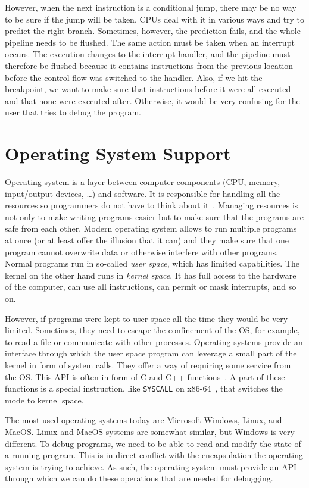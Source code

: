 However, when the next instruction is a conditional jump, there may be no way
to be sure if the jump will be taken. CPUs deal with it in various ways and try
to predict the right branch. Sometimes, however, the prediction fails, and the
whole pipeline needs to be flushed. The same action must be taken when an
interrupt occurs. The execution changes to the interrupt handler, and the
pipeline must therefore be flushed because it contains instructions from the
previous location before the control flow was switched to the handler. Also, if
we hit the breakpoint, we want to make sure that instructions before it were
all executed and that none were executed after. Otherwise, it would be very
confusing for the user that tries to debug the program.

\section{Operating System Support}
Operating system is a layer between computer components (CPU, memory,
input/output devices, \dots) and software. It is responsible for handling all
the resources so programmers do not have to think about it~\cite{modern-os,
os-concepts}. Managing resources is not only to make writing programs easier
but to make sure that the programs are safe from each other. Modern operating
system allows to run multiple programs at once (or at least offer the illusion
that it can) and they make sure that one program cannot overwrite data or
otherwise interfere with other programs. Normal programs run in so-called
\textit{user space}, which has limited capabilities. The kernel on the other
hand runs in \textit{kernel space}. It has full access to the hardware of the
computer, can use all instructions, can permit or mask interrupts, and so on.

However, if programs were kept to user space all the time they would be very
limited. Sometimes, they need to escape the confinement of the OS, for example,
to read a file or communicate with other processes. Operating systems provide
an interface through which the user space program can leverage a small part of
the kernel in form of system calls. They offer a way of requiring some service
from the OS. This API is often in form of C and C++
functions~\cite{os-concepts}. A part of these functions is a special
instruction, like \texttt{SYSCALL} on x86-64~\cite{intel-manual}, that switches
the mode to kernel space.

The most used operating systems today are Microsoft Windows, Linux, and MacOS.
Linux and MacOS systems are somewhat similar, but Windows is very different. To
debug programs, we need to be able to read and modify the state of a running
program. This is in direct conflict with the encapsulation the operating system
is trying to achieve. As such, the operating system must provide an API through
which we can do these operations that are needed for debugging.


